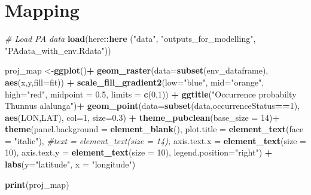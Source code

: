 \documentclass[
]{book}
\newenvironment{Shaded}{\begin{snugshade}}{\end{snugshade}}
\newcommand{\AttributeTok}[1]{\textcolor[rgb]{0.13,0.29,0.53}{#1}}
\newcommand{\CommentTok}[1]{\textcolor[rgb]{0.56,0.35,0.01}{\textit{#1}}}
\newcommand{\DecValTok}[1]{\textcolor[rgb]{0.00,0.00,0.81}{#1}}
\newcommand{\FloatTok}[1]{\textcolor[rgb]{0.00,0.00,0.81}{#1}}
\newcommand{\FunctionTok}[1]{\textcolor[rgb]{0.13,0.29,0.53}{\textbf{#1}}}
\newcommand{\NormalTok}[1]{#1}
\newcommand{\OtherTok}[1]{\textcolor[rgb]{0.56,0.35,0.01}{#1}}
\newcommand{\SpecialCharTok}[1]{\textcolor[rgb]{0.81,0.36,0.00}{\textbf{#1}}}
\newcommand{\StringTok}[1]{\textcolor[rgb]{0.31,0.60,0.02}{#1}}
\begin{document}
\section{Mapping}\label{mapping}

\begin{Shaded}
\begin{Highlighting}[]
\CommentTok{\# Load PA data}
\FunctionTok{load}\NormalTok{(here}\SpecialCharTok{::}\FunctionTok{here}\NormalTok{ (}\StringTok{"data"}\NormalTok{, }\StringTok{"outputs\_for\_modelling"}\NormalTok{, }\StringTok{"PAdata\_with\_env.Rdata"}\NormalTok{))}


\NormalTok{proj\_map }\OtherTok{\textless{}{-}}\FunctionTok{ggplot}\NormalTok{()}\SpecialCharTok{+}
  \FunctionTok{geom\_raster}\NormalTok{(}\AttributeTok{data=}\FunctionTok{subset}\NormalTok{(env\_dataframe),}
              \FunctionTok{aes}\NormalTok{(x,y,}\AttributeTok{fill=}\NormalTok{fit)) }\SpecialCharTok{+}
  \FunctionTok{scale\_fill\_gradient2}\NormalTok{(}\AttributeTok{low=}\StringTok{"blue"}\NormalTok{, }
                       \AttributeTok{mid=}\StringTok{"orange"}\NormalTok{,}
                       \AttributeTok{high=}\StringTok{"red"}\NormalTok{,}
                       \AttributeTok{midpoint =} \FloatTok{0.5}\NormalTok{,}
                       \AttributeTok{limits =} \FunctionTok{c}\NormalTok{(}\DecValTok{0}\NormalTok{,}\DecValTok{1}\NormalTok{)) }\SpecialCharTok{+}
  \FunctionTok{ggtitle}\NormalTok{(}\StringTok{"Occurrence probabilty Thunnus alalunga"}\NormalTok{)}\SpecialCharTok{+} 
  \FunctionTok{geom\_point}\NormalTok{(}\AttributeTok{data=}\FunctionTok{subset}\NormalTok{(data,occurrenceStatus}\SpecialCharTok{==}\DecValTok{1}\NormalTok{),}
             \FunctionTok{aes}\NormalTok{(LON,LAT),}
             \AttributeTok{col=}\DecValTok{1}\NormalTok{,}
             \AttributeTok{size=}\FloatTok{0.3}\NormalTok{) }\SpecialCharTok{+}
  \FunctionTok{theme\_pubclean}\NormalTok{(}\AttributeTok{base\_size =} \DecValTok{14}\NormalTok{)}\SpecialCharTok{+}
  \FunctionTok{theme}\NormalTok{(}\AttributeTok{panel.background =} \FunctionTok{element\_blank}\NormalTok{(),}
        \AttributeTok{plot.title =} \FunctionTok{element\_text}\NormalTok{(}\AttributeTok{face =} \StringTok{"italic"}\NormalTok{), }
        \CommentTok{\#text = element\_text(size = 14), }
        \AttributeTok{axis.text.x =} \FunctionTok{element\_text}\NormalTok{(}\AttributeTok{size =} \DecValTok{10}\NormalTok{),}
        \AttributeTok{axis.text.y =} \FunctionTok{element\_text}\NormalTok{(}\AttributeTok{size =} \DecValTok{10}\NormalTok{),}
        \AttributeTok{legend.position=}\StringTok{"right"}\NormalTok{) }\SpecialCharTok{+}
  \FunctionTok{labs}\NormalTok{(}\AttributeTok{y=}\StringTok{"latitude"}\NormalTok{, }\AttributeTok{x =} \StringTok{"longitude"}\NormalTok{)}
  
\FunctionTok{print}\NormalTok{(proj\_map)}
\end{Highlighting}
\end{Shaded}
\end{document}

